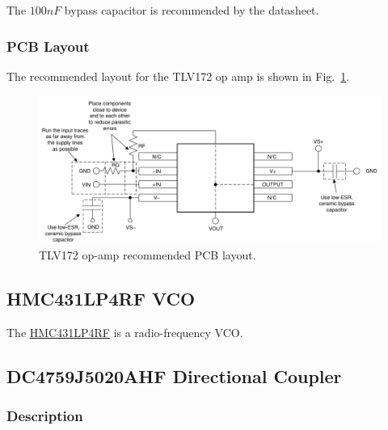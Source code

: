 The $100 \si{nF}$ bypass capacitor is recommended by the datasheet.

\subsubsection{PCB Layout}
\label{sec:tlv172-pcb}

The recommended layout for the TLV172 op amp is shown in Fig.~\ref{fig:tlv172-pcb}.

\begin{figure}[h]
        \centering
        \includegraphics[width=\textwidth]{data/tlv172-pcb}
        \caption{TLV172 op-amp recommended PCB layout.}
        \label{fig:tlv172-pcb}
\end{figure}

\subsection{HMC431LP4RF VCO}
\label{sec:hmc431lp4rf}

The
\href{http://www.analog.com/media/en/technical_documentation/data_sheets/hmc431.pdf}{HMC431LP4RF} is
a radio-frequency VCO\@.

\subsection{DC4759J5020AHF Directional Coupler}
\label{sec:dc4759j5020ahf}

\subsubsection{Description}
\label{sec:dc4759j5020ahf-description}

